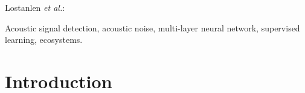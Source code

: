 \documentclass[journal]{IEEEtran}
\begin{document}
%
{Lostanlen \MakeLowercase{\textit{et al.}}: \title{}}
% 











\maketitle

\begin{abstract}

\end{abstract}

\begin{IEEEkeywords}
Acoustic signal detection, acoustic noise, multi-layer neural network, supervised learning, ecosystems.
\end{IEEEkeywords}

%
\IEEEpeerreviewmaketitle

\section{Introduction}
% 
% 
% 
%
\end{document}
